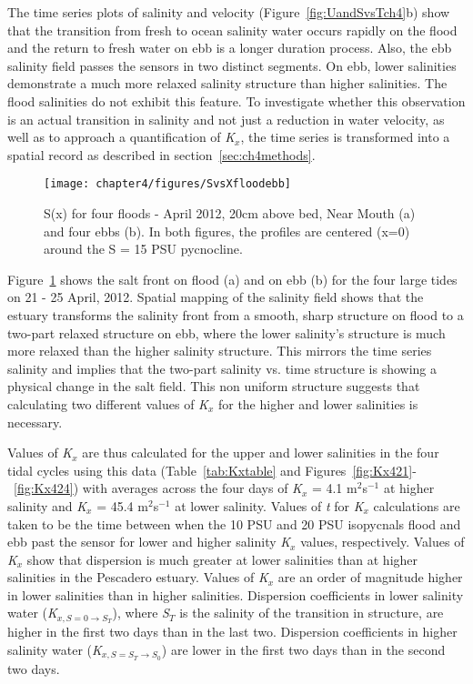 The time series plots of salinity and velocity (Figure~\ref{fig:UandSvsTch4}b) show that the transition from fresh to ocean salinity water occurs rapidly on the flood and the return to fresh water on ebb is a longer duration process. Also, the ebb salinity field passes the sensors in two distinct segments. On ebb, lower salinities demonstrate a much more relaxed salinity structure than higher salinities. The flood salinities do not exhibit this feature. To investigate whether this observation is an actual transition in salinity and not just a reduction in water velocity, as well as to approach a quantification of \emph{K$_x$}, the time series is transformed into a spatial record as described in section~\ref{sec:ch4methods}. 

\begin{figure}[hp]
	\texttt{[image: chapter4/figures/SvsXfloodebb]} 
\caption{S(x) for four floods - April 2012, 20cm above bed, Near Mouth (a) and four ebbs (b). In both figures, the profiles are centered (x=0) around the S = 15 PSU pycnocline.} \label{fig:SvsXall}
\end{figure}

Figure~\ref{fig:SvsXall} shows the salt front on flood (a) and on ebb (b) for the four large tides on 21 - 25 April, 2012. Spatial mapping of the salinity field shows that the estuary transforms  the salinity front from a smooth, sharp structure on flood to a two-part relaxed structure on ebb, where the lower salinity's structure is much more relaxed than the higher salinity structure. This mirrors the time series salinity and implies that the two-part salinity vs. time structure is showing a physical change in the salt field. This non uniform structure suggests that calculating two different values of \emph{K$_x$} for the higher and lower salinities is necessary.

Values of \emph{K$_x$} are thus calculated for the upper and lower salinities in the four tidal cycles using this data (Table~\ref{tab:Kxtable} and Figures~\ref{fig:Kx421}-~\ref{fig:Kx424}) with averages across the four days of \emph{K$_x$} = 4.1 m$^2$s$^{-1}$ at higher salinity and \emph{K$_x$} = 45.4 m$^2$s$^{-1}$ at lower salinity. Values of \emph{t} for \emph{K$_x$} calculations are taken to be the time between when the 10 PSU and 20 PSU isopycnals flood and ebb past the sensor for lower and higher salinity \emph{K$_x$} values, respectively. Values of \emph{K$_x$} show that dispersion is much greater at lower salinities than at higher salinities in the Pescadero estuary.  Values of \emph{K$_x$} are an order of magnitude higher in lower salinities than in higher salinities. Dispersion coefficients in lower salinity water (\emph{K$_{x,S=0 \rightarrow S_T}$}), where \emph{S$_T$} is the salinity of the transition in structure, are higher in the first two days than in the last two. Dispersion coefficients in higher salinity water (\emph{K$_{x,S=S_T \rightarrow S_0}$}) are lower in the first two days than in the second two days. 

